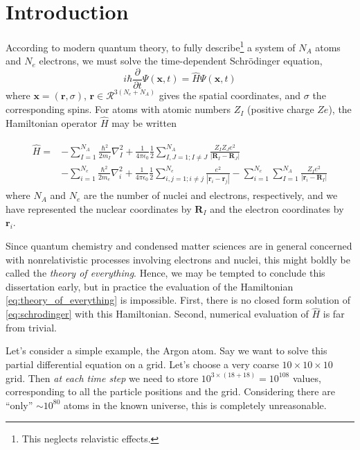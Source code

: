 \chapter{Introduction}
\label{chap:intro}

According to modern quantum theory, to fully describe\footnote{This neglects relavistic effects.} a system of $N_A$ atoms and $N_e$ electrons, we must solve the time-dependent Schr\"odinger equation,
\begin{equation}
    \label{eq:schrodinger}
    i \hbar \frac{\partial}{\partial t} \Psi(\bm{x}, t)
    = \hat{H} \Psi(\bm{x}, t)
\end{equation}
where $\bm x=(\bm{r}, \sigma)$, $\bm r\in\mathcal{R}^{3(N_e+N_A)}$ gives the spatial coordinates, and $\sigma$ the corresponding spins. For atoms with atomic numbers $Z_I$ (positive charge $Ze$), the Hamiltonian operator $\hat H$ may be written

\begin{align}
\begin{split}
\label{eq:theory_of_everything}
\hat H =& -\sum_{I=1}^{N_A}\frac{\hbar^2}{2m_I} \nabla^2_I
+ \frac 1{4\pi\epsilon_0} \frac 12\sum_{I,J=1;I\neq J}^{N_A} \frac{Z_IZ_Je^2}{|\bm R_I-\bm R_J|} \\
&- \sum_{i=1}^{N_e} \frac{\hbar^2}{2m_e} \nabla^2_i
+ \frac 1{4\pi\epsilon_0} \frac 12\sum_{i,j=1;i\neq j}^{N_e} \frac{e^2}{|\bm r_i-\bm r_j|}
- \sum_{i=1}^{N_e} \sum_{I=1}^{N_A} \frac{Z_I e^2}{|\bm r_i-\bm R_I|}
\end{split}
\end{align}
where $N_A$ and $N_e$ are the number of nuclei and electrons, respectively, and we have represented the nuclear coordinates by $\bm R_I$ and the electron coordinates by $\bm r_i$.

Since quantum chemistry and condensed matter sciences are in general concerned with nonrelativistic processes involving electrons and nuclei, this might boldly be called the \emph{theory of everything}.\cite{laughlinTheory2000} Hence, we may be tempted to conclude this dissertation early, but in practice the evaluation of the Hamiltonian \eqref{eq:theory_of_everything} is impossible. First, there is no closed form solution of \eqref{eq:schrodinger} with this Hamiltonian. Second, numerical evaluation of $\hat H$ is far from trivial.

Let's consider a simple example, the Argon atom. Say we want to solve this partial differential equation on a grid. Let's choose a very coarse $10\times 10\times 10$ grid. Then \emph{at each time step} we need to store $10^{3\times (18+18)}=10^{108}$ values, corresponding to all the particle positions and the grid. Considering there are ``only'' $\sim 10^{80}$ atoms in the known universe,\cite{rydenIntroduction2017} this is completely unreasonable.

